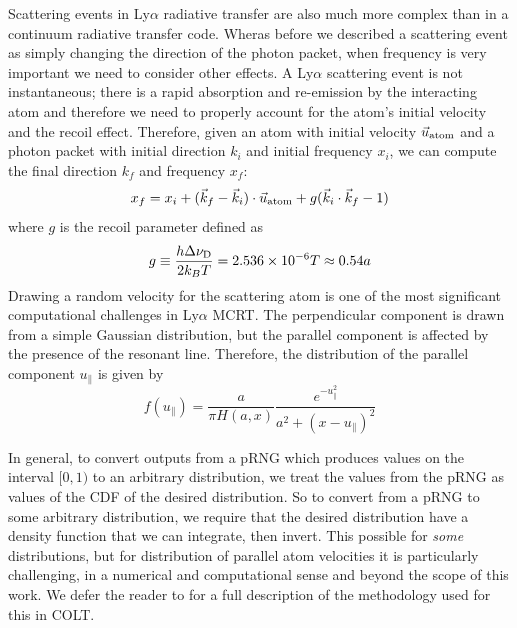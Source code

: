 Scattering events in Ly$\alpha$ radiative transfer are also much more complex than in a continuum radiative transfer code.
Wheras before we described a scattering event as simply changing the direction of the photon packet, when frequency is very important we need to consider other effects.
A Ly$\alpha$ scattering event is not instantaneous; there is a rapid absorption and re-emission by the interacting atom and therefore we need to properly account for the atom's initial velocity and the recoil effect.
Therefore, given an atom with initial velocity $\vec{u}_{\rm{atom}}$ and a photon packet with initial direction $k_{i}$ and initial frequency $x_{i}$, we can compute the final direction $k_{f}$ and frequency $x_{f}$:
\begin{equation}
    x_{f} = x_{i} + (\vec{k}_{f} - \vec{k}_{i})\cdot \vec{u}_{\rm{atom}} + g(\vec{k}_{i}\cdot\vec{k}_{f} - 1)
\end{equation}
where $g$ is the recoil parameter defined as
\begin{equation}
    g \equiv \frac{h\Delta\nu_{\rm{D}}}{2k_{B}T} = 2.536 \times 10^{-6}T \approx 0.54 a
\end{equation}
Drawing a random velocity for the scattering atom is one of the most significant computational challenges in Ly$\alpha$ MCRT.
The perpendicular component is drawn from a simple Gaussian distribution, but the parallel component is affected by the presence of the resonant line.
Therefore, the distribution of the parallel component $u_{\parallel}$ is given by
\begin{equation}
    f(u_{\parallel}) = \frac{a}{\pi H(a, x)}\frac{e^{-u_{\parallel}^{2}}}{a^{2} + (x - u_{\parallel})^{2}}
\end{equation}

In general, to convert outputs from a pRNG which produces values on the interval $[0, 1)$ to an arbitrary distribution, we treat the values from the pRNG as values of the CDF of the desired distribution.
So to convert from a pRNG to some arbitrary distribution, we require that the desired distribution have a density function that we can integrate, then invert.
This possible for \emph{some} distributions, but for distribution of parallel atom velocities it is particularly challenging, in a numerical and computational sense and beyond the scope of this work.
We defer the reader to \citep{Smith2015} for a full description of the methodology used for this in \textsc{COLT}.

